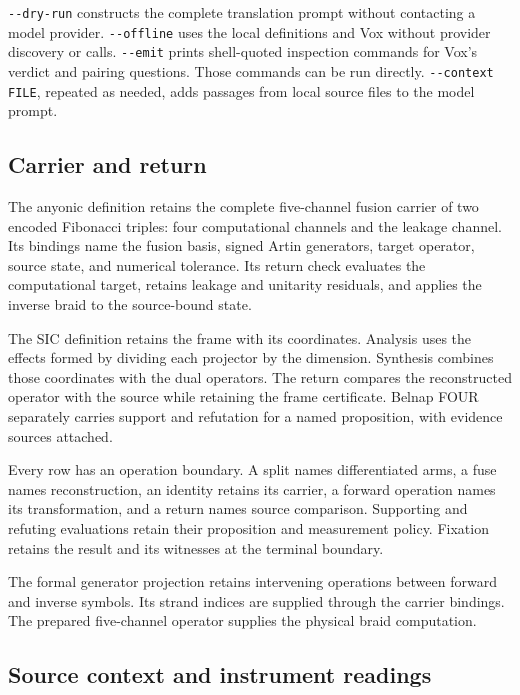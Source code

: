 \documentclass[12pt,a4paper]{article}
\begin{document}
\texttt{-\allowbreak -\allowbreak dry-\allowbreak run} constructs the complete translation prompt without contacting a model provider. \texttt{-\allowbreak -\allowbreak offline} uses the local definitions and Vox without provider discovery or calls. \texttt{-\allowbreak -\allowbreak emit} prints shell-quoted inspection commands for Vox's verdict and pairing questions. Those commands can be run directly. \texttt{-\allowbreak -\allowbreak context FILE}, repeated as needed, adds passages from local source files to the model prompt.

\subsection{Carrier and return}

The anyonic definition retains the complete five-channel fusion carrier of two encoded Fibonacci triples: four computational channels and the leakage channel. Its bindings name the fusion basis, signed Artin generators, target operator, source state, and numerical tolerance. Its return check evaluates the computational target, retains leakage and unitarity residuals, and applies the inverse braid to the source-bound state.

The SIC definition retains the frame with its coordinates. Analysis uses the effects formed by dividing each projector by the dimension. Synthesis combines those coordinates with the dual operators. The return compares the reconstructed operator with the source while retaining the frame certificate. Belnap FOUR separately carries support and refutation for a named proposition, with evidence sources attached.

Every row has an operation boundary. A split names differentiated arms, a fuse names reconstruction, an identity retains its carrier, a forward operation names its transformation, and a return names source comparison. Supporting and refuting evaluations retain their proposition and measurement policy. Fixation retains the result and its witnesses at the terminal boundary.

The formal generator projection retains intervening operations between forward and inverse symbols. Its strand indices are supplied through the carrier bindings. The prepared five-channel operator supplies the physical braid computation.

\subsection{Source context and instrument readings}
\end{document}
